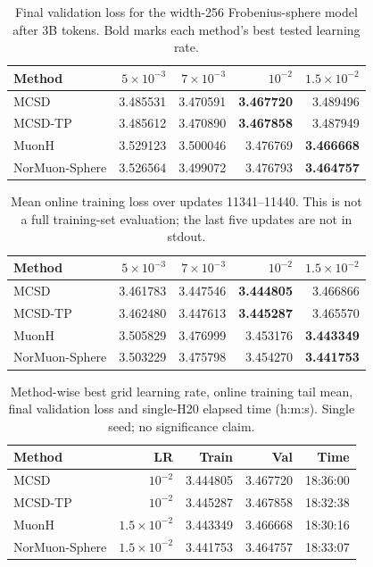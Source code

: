 \begin{table}[t]
\centering\small
\caption{Final validation loss for the width-256 Frobenius-sphere model after 3B tokens. Bold marks each method's best tested learning rate.}
\label{tab:frobenius-3b-lr}
\begin{tabular}{lrrrr}
\toprule
Method & $5\times10^{-3}$ & $7\times10^{-3}$ & $10^{-2}$ & $1.5\times10^{-2}$ \\
\midrule
MCSD & 3.485531 & 3.470591 & \textbf{3.467720} & 3.489496 \\
MCSD-TP & 3.485612 & 3.470890 & \textbf{3.467858} & 3.487949 \\
MuonH & 3.529123 & 3.500046 & 3.476769 & \textbf{3.466668} \\
NorMuon-Sphere & 3.526564 & 3.499072 & 3.476793 & \textbf{3.464757} \\
\bottomrule
\end{tabular}
\end{table}

\begin{table}[t]
\centering\small
\caption{Mean online training loss over updates 11341--11440. This is not a full training-set evaluation; the last five updates are not in stdout.}
\label{tab:frobenius-3b-train}
\begin{tabular}{lrrrr}
\toprule
Method & $5\times10^{-3}$ & $7\times10^{-3}$ & $10^{-2}$ & $1.5\times10^{-2}$ \\
\midrule
MCSD & 3.461783 & 3.447546 & \textbf{3.444805} & 3.466866 \\
MCSD-TP & 3.462480 & 3.447613 & \textbf{3.445287} & 3.465570 \\
MuonH & 3.505829 & 3.476999 & 3.453176 & \textbf{3.443349} \\
NorMuon-Sphere & 3.503229 & 3.475798 & 3.454270 & \textbf{3.441753} \\
\bottomrule
\end{tabular}
\end{table}

\begin{table}[t]
\centering\small
\caption{Method-wise best grid learning rate, online training tail mean, final validation loss and single-H20 elapsed time (h:m:s). Single seed; no significance claim.}
\label{tab:frobenius-3b-best}
\begin{tabular}{lrrrr}
\toprule
Method & LR & Train & Val & Time \\
\midrule
MCSD & $10^{-2}$ & 3.444805 & 3.467720 & 18:36:00 \\
MCSD-TP & $10^{-2}$ & 3.445287 & 3.467858 & 18:32:38 \\
MuonH & $1.5\times10^{-2}$ & 3.443349 & 3.466668 & 18:30:16 \\
NorMuon-Sphere & $1.5\times10^{-2}$ & 3.441753 & 3.464757 & 18:33:07 \\
\bottomrule
\end{tabular}
\end{table}
